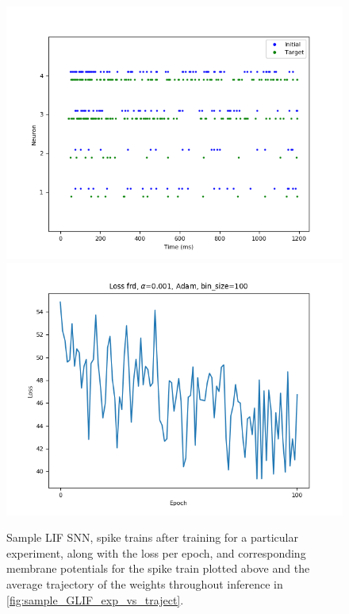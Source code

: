 \documentclass[mphil,deptreport,ianc]{infthesis} %
\begin{document}
\begin{figure}
    \centering
    \vspace{-0.1in}
    \includegraphics[width=0.9\columnwidth]{figures/samples/LIF/12-10_09-55-57-223/spike_trains_train_iter_100.png}
    \vspace{-0.1in}
    \includegraphics[width=0.9\columnwidth]{figures/samples/LIF/12-10_09-55-57-223/plot_loss_test12-10_09-56-55-12812-10_09-56-55-128.png}
    \vspace{-0.1in}
    \caption{Sample LIF SNN, spike trains after training for a particular experiment, along with the loss per epoch, and corresponding membrane potentials for the spike train plotted above and the average trajectory of the weights throughout inference in \ref{fig:sample_GLIF_exp_vs_traject}.}
    \label{fig:sample_LIF_exp_spikes_loss}
\end{figure}
\end{document}
